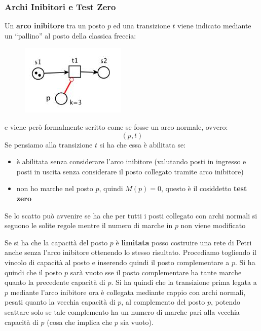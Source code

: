 \documentclass[a4paper,12pt, oneside]{book}
\begin{document}
\subsubsection{Archi Inibitori e Test Zero}
\begin{definizione}
  Un\textbf{ arco inibitore} tra un posto $p$ ed una transizione $t$ viene
  indicato mediante un ``pallino'' al posto della classica freccia:
  \begin{figure}[H]
    \centering
    \includegraphics[scale = 0.7]{img/inib.jpg}
  \end{figure}
  e viene però formalmente scritto come se fosse un arco normale, ovvero:
  \[(p,t)\]
  Se pensiamo alla transizione $t$ si ha che essa è abilitata se:
  \begin{itemize}
    \item è abilitata senza considerare l’arco inibitore (valutando posti in
    ingresso e posti in uscita senza considerare il posto collegato tramite arco
    inibitore)
    \item non ho marche nel posto $p$, quindi $M(p)=0$, questo è il cosiddetto
    \textbf{test zero}
  \end{itemize}
  Se lo scatto può avvenire se ha che per tutti i posti collegato con archi
  normali si seguono le solite regole mentre il numero di marche in $p$ non
  viene modificato
\end{definizione}
Se si ha che la capacità del posto $p$ è \textbf{limitata} posso costruire una
rete di Petri anche senza l'arco inibitore ottenendo lo stesso
risultato. Procediamo togliendo il vincolo di capacità al posto e inserendo
quindi il posto complementare a $p$. Si ha quindi che il posto $p$ sarà vuoto
sse il posto complementare ha tante marche quanto la precedente capacità di
$p$. Si ha quindi che la transizione prima legata a $p$ mediante l'arco
inibitore ora è collegata mediante cappio con archi normali, pesati quanto la
vecchia capacità di $p$, al complemento del posto $p$, potendo scattare solo se
tale complemento ha un numero di marche pari alla vecchia capacità di $p$ (cosa
che implica che $p$ sia vuoto).
\end{document}

